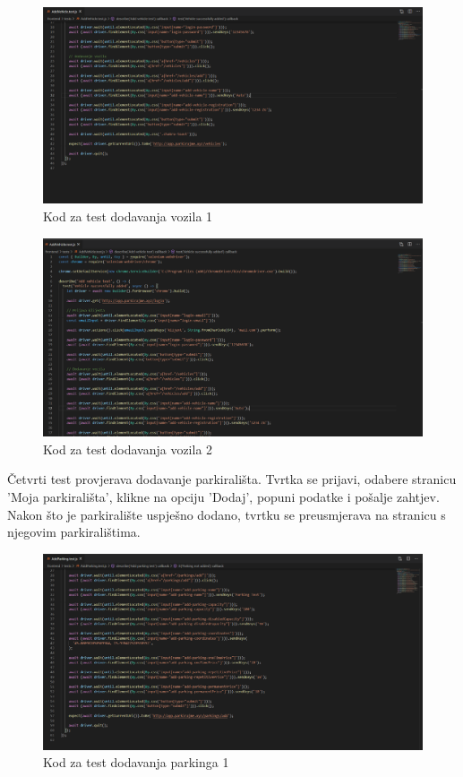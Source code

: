 		\begin{figure}[H]
			\includegraphics[width=1\linewidth]{images/AddVehicle1.png}
			\caption{Kod za test dodavanja vozila 1}
			\label{fig:AddVehicle test - kod 1} 
		\end{figure}
	
	\begin{figure}[H]
		\includegraphics[width=1\linewidth]{images/AddVehicle2.png}
		\caption{Kod za test dodavanja vozila 2}
		\label{fig:AddVehicle test - kod 2} 
	\end{figure}

			
			Četvrti test provjerava dodavanje parkirališta. Tvrtka se prijavi, odabere stranicu 'Moja parkirališta', klikne na opciju 'Dodaj', popuni podatke i pošalje zahtjev. Nakon što je parkiralište uspješno dodano, tvrtku se preusmjerava na stranicu s njegovim parkiralištima.

\begin{figure}[H]
	\includegraphics[width=1\linewidth]{images/AddParking1.png}
	\caption{Kod za test dodavanja parkinga 1}
	\label{fig:AddParking test - kod 1} 
\end{figure}

